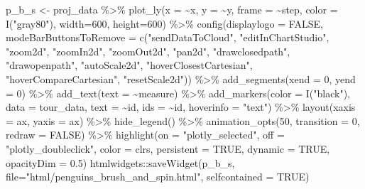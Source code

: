 \documentclass[
  letterpaper,
]{book}
\newenvironment{Shaded}{\begin{snugshade}}{\end{snugshade}}
\newcommand{\AttributeTok}[1]{\textcolor[rgb]{0.40,0.45,0.13}{#1}}
\newcommand{\ConstantTok}[1]{\textcolor[rgb]{0.56,0.35,0.01}{#1}}
\newcommand{\DecValTok}[1]{\textcolor[rgb]{0.68,0.00,0.00}{#1}}
\newcommand{\FloatTok}[1]{\textcolor[rgb]{0.68,0.00,0.00}{#1}}
\newcommand{\FunctionTok}[1]{\textcolor[rgb]{0.28,0.35,0.67}{#1}}
\newcommand{\NormalTok}[1]{\textcolor[rgb]{0.00,0.23,0.31}{#1}}
\newcommand{\OtherTok}[1]{\textcolor[rgb]{0.00,0.23,0.31}{#1}}
\newcommand{\SpecialCharTok}[1]{\textcolor[rgb]{0.37,0.37,0.37}{#1}}
\newcommand{\StringTok}[1]{\textcolor[rgb]{0.13,0.47,0.30}{#1}}
\begin{document}
\begin{Shaded}
\begin{Highlighting}[]
\NormalTok{p\_b\_s }\OtherTok{\textless{}{-}}\NormalTok{ proj\_data }\SpecialCharTok{\%\textgreater{}\%}
  \FunctionTok{plot\_ly}\NormalTok{(}\AttributeTok{x =} \SpecialCharTok{\textasciitilde{}}\NormalTok{x, }\AttributeTok{y =} \SpecialCharTok{\textasciitilde{}}\NormalTok{y, }\AttributeTok{frame =} \SpecialCharTok{\textasciitilde{}}\NormalTok{step, }
          \AttributeTok{color =} \FunctionTok{I}\NormalTok{(}\StringTok{"gray80"}\NormalTok{),}
          \AttributeTok{width=}\DecValTok{600}\NormalTok{, }\AttributeTok{height=}\DecValTok{600}\NormalTok{) }\SpecialCharTok{\%\textgreater{}\%}
  \FunctionTok{config}\NormalTok{(}\AttributeTok{displaylogo =} \ConstantTok{FALSE}\NormalTok{, }
         \AttributeTok{modeBarButtonsToRemove =} \FunctionTok{c}\NormalTok{(}\StringTok{"sendDataToCloud"}\NormalTok{, }\StringTok{"editInChartStudio"}\NormalTok{, }\StringTok{"zoom2d"}\NormalTok{, }\StringTok{"zoomIn2d"}\NormalTok{, }\StringTok{"zoomOut2d"}\NormalTok{, }\StringTok{"pan2d"}\NormalTok{, }\StringTok{"drawclosedpath"}\NormalTok{, }\StringTok{"drawopenpath"}\NormalTok{, }\StringTok{"autoScale2d"}\NormalTok{, }\StringTok{"hoverClosestCartesian"}\NormalTok{, }\StringTok{"hoverCompareCartesian"}\NormalTok{, }\StringTok{"resetScale2d"}\NormalTok{)) }\SpecialCharTok{\%\textgreater{}\%}
  \FunctionTok{add\_segments}\NormalTok{(}\AttributeTok{xend =} \DecValTok{0}\NormalTok{, }\AttributeTok{yend =} \DecValTok{0}\NormalTok{) }\SpecialCharTok{\%\textgreater{}\%}
  \FunctionTok{add\_text}\NormalTok{(}\AttributeTok{text =} \SpecialCharTok{\textasciitilde{}}\NormalTok{measure) }\SpecialCharTok{\%\textgreater{}\%}
  \FunctionTok{add\_markers}\NormalTok{(}\AttributeTok{color =} \FunctionTok{I}\NormalTok{(}\StringTok{"black"}\NormalTok{), }\AttributeTok{data =}\NormalTok{ tour\_data, }\AttributeTok{text =} \SpecialCharTok{\textasciitilde{}}\NormalTok{id, }\AttributeTok{ids =} \SpecialCharTok{\textasciitilde{}}\NormalTok{id, }\AttributeTok{hoverinfo =} \StringTok{"text"}\NormalTok{) }\SpecialCharTok{\%\textgreater{}\%}
  \FunctionTok{layout}\NormalTok{(}\AttributeTok{xaxis =}\NormalTok{ ax, }\AttributeTok{yaxis =}\NormalTok{ ax) }\SpecialCharTok{\%\textgreater{}\%}
  \FunctionTok{hide\_legend}\NormalTok{() }\SpecialCharTok{\%\textgreater{}\%}
  \FunctionTok{animation\_opts}\NormalTok{(}\DecValTok{50}\NormalTok{, }\AttributeTok{transition =} \DecValTok{0}\NormalTok{, }\AttributeTok{redraw =} \ConstantTok{FALSE}\NormalTok{) }\SpecialCharTok{\%\textgreater{}\%}
  \FunctionTok{highlight}\NormalTok{(}\AttributeTok{on =} \StringTok{"plotly\_selected"}\NormalTok{, }
            \AttributeTok{off =} \StringTok{"plotly\_doubleclick"}\NormalTok{,}
            \AttributeTok{color =}\NormalTok{ clrs, }
            \AttributeTok{persistent =} \ConstantTok{TRUE}\NormalTok{, }
            \AttributeTok{dynamic =} \ConstantTok{TRUE}\NormalTok{, }
            \AttributeTok{opacityDim =} \FloatTok{0.5}\NormalTok{)}
\NormalTok{htmlwidgets}\SpecialCharTok{::}\FunctionTok{saveWidget}\NormalTok{(p\_b\_s,}
          \AttributeTok{file=}\StringTok{"html/penguins\_brush\_and\_spin.html"}\NormalTok{,}
          \AttributeTok{selfcontained =} \ConstantTok{TRUE}\NormalTok{)}
\end{Highlighting}
\end{Shaded}
\end{document}

